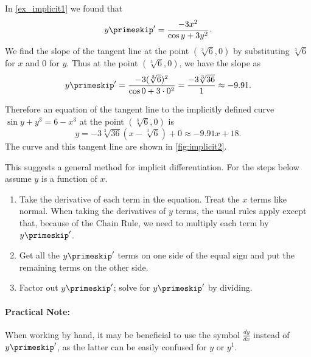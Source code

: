 %
{In \autoref{ex_implicit1} we found that $$y\primeskip' = \frac{-3x^2}{\cos y +3y^2}.$$ We find the slope of the tangent line at the point  $(\sqrt[3]6,0)$ by substituting $\sqrt[3]6$ for $x$ and $0$ for $y$. Thus at the point $(\sqrt[3]6,0)$, we have the slope as
\[y\primeskip' = \frac{-3(\sqrt[3]{6})^2}{\cos 0 + 3\cdot0^2} = \frac{-3\sqrt[3]{36}}{1} \approx -9.91.\]

Therefore an equation of the tangent line to the implicitly defined curve $\sin y + y^3=6-x^3$ at the point $(\sqrt[3]{6},0)$ is
\[y = -3\sqrt[3]{36}(x-\sqrt[3]{6})+0 \approx -9.91x+18.\]
The curve and this tangent line are shown in \autoref{fig:implicit2}.}


This suggests a general method for implicit differentiation.  For the steps below assume $y$ is a function of $x$.
\begin{enumerate}
\item Take the derivative of each term in the equation.  Treat the $x$ terms like normal.  When taking the derivatives of $y$ terms, the usual rules apply except that, because of the Chain Rule, we need to multiply each term by $y\primeskip'$.
\item Get all the $y\primeskip'$ terms on one side of the equal sign and put the remaining terms on the other side.
\item Factor out $y\primeskip'$;  solve for $y\primeskip'$ by dividing.
\end{enumerate}

\paragraph{Practical Note:}When working by hand, it may be beneficial to use the symbol $\frac{dy}{dx}$ instead of $y\primeskip'$, as the latter can be easily confused for $y$ or $y^1$.

